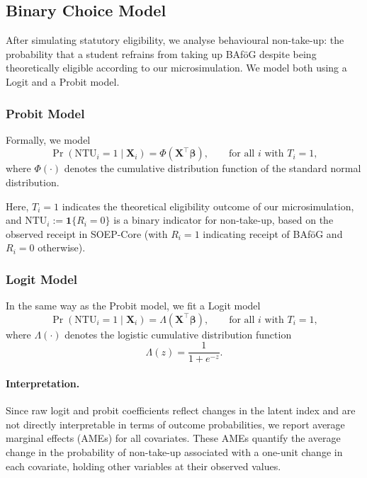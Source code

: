 \subsection{Binary Choice Model}
After simulating statutory eligibility, we analyse behavioural non-take-up: the probability that a student refrains from taking up BAföG despite being theoretically eligible according to our microsimulation. 
We model both using a Logit and a Probit model.

\subsubsection{Probit Model}
Formally, we model
\begin{equation}
  \Pr(\mathrm{NTU}_i = 1 \mid \mathbf{X}_i) = \Phi(\mathbf{X}^\top \boldsymbol{\beta})
  , \qquad \text{for all } i \text{ with } T_i = 1,
\end{equation}
where \( \Phi(\cdot) \) denotes the cumulative distribution function of the standard normal distribution. 

Here, \( T_i = 1 \) indicates the theoretical eligibility outcome of our microsimulation, and \( \mathrm{NTU}_i := \mathbf{1}\{R_i = 0\} \) is a binary indicator for non-take-up, based on the observed receipt in SOEP-Core (with \( R_i = 1 \) indicating receipt of BAföG and \( R_i = 0 \) otherwise).

\subsubsection{Logit Model}
In the same way as the Probit model, we fit a Logit model
\begin{equation}
  \Pr(\mathrm{NTU}_i = 1 \mid \mathbf{X}_i) = \Lambda(\mathbf{X}^\top \boldsymbol{\beta})
  , \qquad \text{for all } i \text{ with } T_i = 1,
\end{equation}
where \( \Lambda(\cdot) \) denotes the logistic cumulative distribution function
\begin{equation}
  \Lambda(z) = \frac{1}{1 + e^{-z}}.
\end{equation}

\paragraph{Interpretation.} %
Since raw logit and probit coefficients reflect changes in the latent index and are not directly interpretable in terms of outcome probabilities, we report average marginal effects (AMEs) for all covariates. These AMEs quantify the average change in the probability of non-take-up associated with a one-unit change in each covariate, holding other variables at their observed values.

